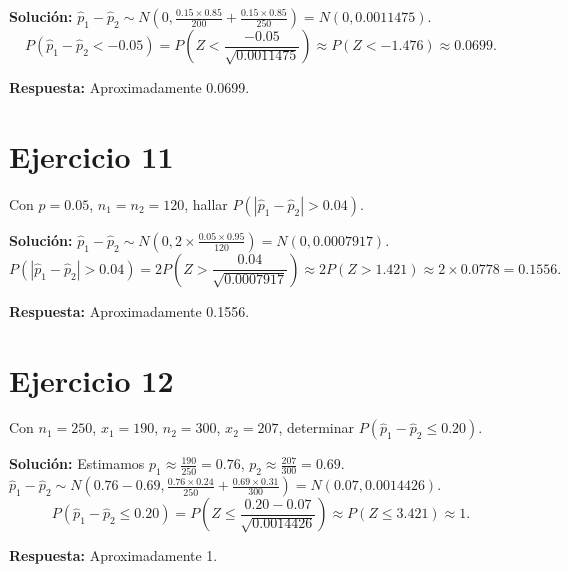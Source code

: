 \documentclass{article}
\begin{document}
\textbf{Solución:}  
$\hat{p}_1 - \hat{p}_2 \sim N\left(0, \frac{0.15 \times 0.85}{200} + \frac{0.15 \times 0.85}{250}\right) = N(0, 0.0011475)$.  
\[ P(\hat{p}_1 - \hat{p}_2 < -0.05) = P\left( Z < \frac{-0.05}{\sqrt{0.0011475}} \right) \approx P(Z < -1.476) \approx 0.0699. \]

\textbf{Respuesta:} Aproximadamente 0.0699.

\section{Ejercicio 11}
Con $p = 0.05$, $n_1 = n_2 = 120$, hallar $P(|\hat{p}_1 - \hat{p}_2| > 0.04)$.

\textbf{Solución:}  
$\hat{p}_1 - \hat{p}_2 \sim N\left(0, 2 \times \frac{0.05 \times 0.95}{120}\right) = N(0, 0.0007917)$.  
\[ P(|\hat{p}_1 - \hat{p}_2| > 0.04) = 2 P\left( Z > \frac{0.04}{\sqrt{0.0007917}} \right) \approx 2 P(Z > 1.421) \approx 2 \times 0.0778 = 0.1556. \]

\textbf{Respuesta:} Aproximadamente 0.1556.

\section{Ejercicio 12}
Con $n_1 = 250$, $x_1 = 190$, $n_2 = 300$, $x_2 = 207$, determinar $P(\hat{p}_1 - \hat{p}_2 \leq 0.20)$.

\textbf{Solución:}  
Estimamos $p_1 \approx \frac{190}{250} = 0.76$, $p_2 \approx \frac{207}{300} = 0.69$.  
$\hat{p}_1 - \hat{p}_2 \sim N\left(0.76 - 0.69, \frac{0.76 \times 0.24}{250} + \frac{0.69 \times 0.31}{300}\right) = N(0.07, 0.0014426)$.  
\[ P(\hat{p}_1 - \hat{p}_2 \leq 0.20) = P\left( Z \leq \frac{0.20 - 0.07}{\sqrt{0.0014426}} \right) \approx P(Z \leq 3.421) \approx 1. \]

\textbf{Respuesta:} Aproximadamente 1.
\end{document}
